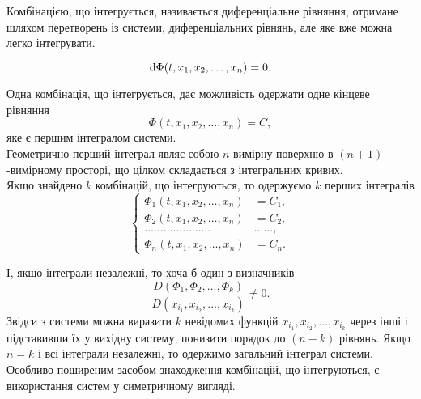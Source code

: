 \begin{definition}
	Комбінацією, що інтегрується, називається диференціальне рівняння, отримане шляхом перетворень із системи, диференціальних рівнянь, але яке вже можна легко інтегрувати.
\end{definition}
\begin{equation*}
	\mathop{}\!\mathrm{d} \Phi(t, x_1, x_2, \ldots, x_n) = 0.
\end{equation*}

Одна комбінація, що інтегрується, дає можливість одержати одне кінцеве рівняння
\begin{equation*}
	\Phi(t, x_1, x_2, \ldots, x_n) = C,
\end{equation*}
яке є першим інтегралом системи. \\

Геометрично перший інтеграл являє собою $n$-вимірну поверхню в $(n + 1)$-вимірному просторі, що цілком складається з інтегральних кривих. \\

Якщо знайдено $k$ комбінацій, що інтегруються, то одержуємо $k$ перших інтегралів
\begin{equation*}
	\left\{
		\begin{aligned}
			\Phi_1(t, x_1, x_2, \ldots, x_n) &= C_1, \\
			\Phi_2(t, x_1, x_2, \ldots, x_n) &= C_2, \\
			\ldots \ldots \ldots \ldots \ldots \ldots \ldots & \ldots \ldots, \\
			\Phi_n(t, x_1, x_2, \ldots, x_n) &= C_n.
		\end{aligned}
	\right.
\end{equation*}
 
І, якщо інтеграли незалежні, то хоча б один з визначників \[\frac{D(\Phi_1, \Phi_2, \ldots, \Phi_k)}{D(x_{i_1}, x_{i_2}, \ldots, x_{i_k})} \ne 0.\] Звідси з системи можна виразити $k$ невідомих функцій $x_{i_1}, x_{i_2}, \ldots, x_{i_k}$ через інші і підставивши їх у вихідну систему, понизити порядок до $(n - k)$ рівнянь. Якщо $n = k$ і всі інтеграли незалежні, то одержимо загальний інтеграл системи. \\

Особливо поширеним засобом знаходження комбінацій, що інтегруються, є використання систем у симетричному вигляді. \\

